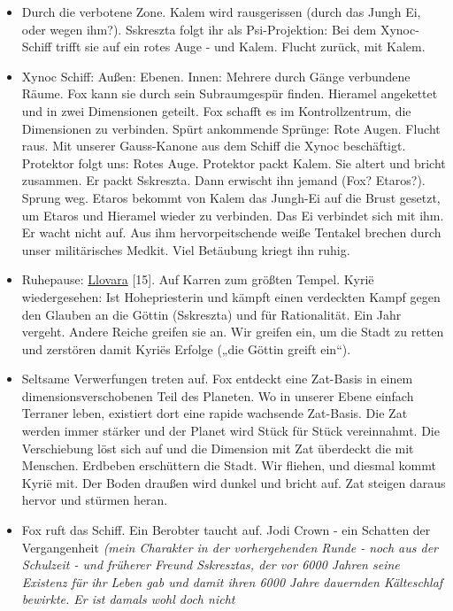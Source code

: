 \documentclass[11pt]{scrartcl}
\begin{document}
\begin{itemize}
\item
  Durch die verbotene Zone. Kalem wird rausgerissen (durch das Jungh Ei,
  oder wegen ihm?). Sskreszta folgt ihr als Psi-Projektion: Bei dem
  Xynoc-Schiff trifft sie auf ein rotes Auge - und Kalem. Flucht zurück,
  mit Kalem.
\item
  Xynoc Schiff: Außen: Ebenen. Innen: Mehrere durch Gänge verbundene
  Räume. Fox kann sie durch sein Subraumgespür finden. Hieramel
  angekettet und in zwei Dimensionen geteilt. Fox schafft es im
  Kontrollzentrum, die Dimensionen zu verbinden. Spürt ankommende
  Sprünge: Rote Augen. Flucht raus. Mit unserer Gauss-Kanone aus dem
  Schiff die Xynoc beschäftigt. Protektor folgt uns: Rotes Auge.
  Protektor packt Kalem. Sie altert und bricht zusammen. Er packt
  Sskreszta. Dann erwischt ihn jemand (Fox? Etaros?). Sprung weg. Etaros
  bekommt von Kalem das Jungh-Ei auf die Brust gesetzt, um Etaros und
  Hieramel wieder zu verbinden. Das Ei verbindet sich mit ihm. Er wacht
  nicht auf. Aus ihm hervorpeitschende weiße Tentakel brechen durch
  unser militärisches Medkit. Viel Betäubung kriegt ihn ruhig.
\item
  Ruhepause:
  \href{http://1w6.org/deutsch/kampagnen/w-chter-der-zeit/orte/llovara}{Llovara}
  {[}15{]}. Auf Karren zum größten Tempel. Kyrië wiedergesehen: Ist
  Hohepriesterin und kämpft einen verdeckten Kampf gegen den Glauben an
  die Göttin (Sskreszta) und für Rationalität. Ein Jahr vergeht. Andere
  Reiche greifen sie an. Wir greifen ein, um die Stadt zu retten und
  zerstören damit Kyriës Erfolge („die Göttin greift ein``).
\item
  Seltsame Verwerfungen treten auf. Fox entdeckt eine Zat-Basis in einem
  dimensionsverschobenen Teil des Planeten. Wo in unserer Ebene einfach
  Terraner leben, existiert dort eine rapide wachsende Zat-Basis. Die
  Zat werden immer stärker und der Planet wird Stück für Stück
  vereinnahmt. Die Verschiebung löst sich auf und die Dimension mit Zat
  überdeckt die mit Menschen. Erdbeben erschüttern die Stadt. Wir
  fliehen, und diesmal kommt Kyrië mit. Der Boden draußen wird dunkel
  und bricht auf. Zat steigen daraus hervor und stürmen heran.
\item
  Fox ruft das Schiff. Ein Berobter taucht auf. Jodi Crown - ein
  Schatten der Vergangenheit \emph{(mein Charakter in der vorhergehenden
  Runde - noch aus der Schulzeit - und früherer Freund Sskresztas, der
  vor 6000 Jahren seine Existenz für ihr Leben gab und damit ihren 6000
  Jahre dauernden Kälteschlaf bewirkte. Er ist damals wohl doch nicht
}
\end{itemize}
\end{document}
